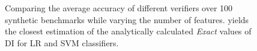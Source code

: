 \begin{figure}[t!]
	\begin{center}	
	\end{center}
	\caption[Accuracy of {\fvgm}]{Comparing the average accuracy of different verifiers over 100 synthetic benchmarks while varying the number of features. {\fvgm} yields the closest estimation of the analytically calculated \textit{Exact} values of DI for LR and SVM classifiers.}\label{fvgm_fig:sanity_exp}
\end{figure}
